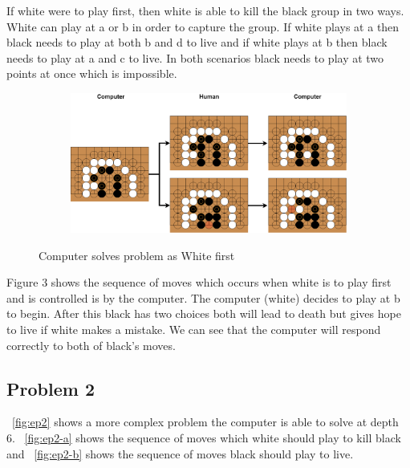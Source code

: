 \documentclass{l4proj}
\begin{document}
If white were to play first, then white is able to kill the black group in two ways. White can play at a or b in order to capture the group. If white plays at a then black needs to play at both b and d to live and if white plays at b then black needs to play at a and c to live. In both scenarios black needs to play at two points at once which is impossible.


\begin{figure}[!ht]
\centering
\begin{subfigure}[b]{\textwidth}
\includegraphics[width=\textwidth]{ep1/ep1-2.png}
\end{subfigure}
\caption{Computer solves problem as White first}
\label{fig:ep1-2}
\end{figure}


Figure 3 shows the sequence of moves which occurs when white is to play first and is controlled is by the computer. The computer (white) decides to play at b to begin. After this black has two choices both will lead to death but gives hope to live if white makes a mistake. We can see that the computer will respond correctly to both of black’s moves.


\subsection{Problem 2}
~\autoref{fig:ep2} shows a more complex problem the computer is able to solve at depth 6. ~\autoref{fig:ep2-a} shows the sequence of moves which white should play to kill black and ~\autoref{fig:ep2-b} shows the sequence of moves black should play to live.
\end{document}
